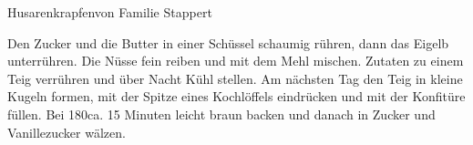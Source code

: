\begin{recipe}{Husarenkrapfen}{von Familie Stappert}
  \inglist

  \steps

  Den Zucker und die Butter in einer Schüssel schaumig rühren, dann das Eigelb
  unterrühren. Die Nüsse fein reiben und mit dem Mehl mischen. Zutaten zu
  einem Teig verrühren und über Nacht Kühl stellen. Am nächsten Tag den Teig in
  kleine Kugeln formen, mit der Spitze eines Kochlöffels eindrücken und mit der
  Konfitüre füllen. Bei 180\celsius ca. 15 Minuten leicht braun backen und
  danach in Zucker und Vanillezucker wälzen.

\end{recipe}
